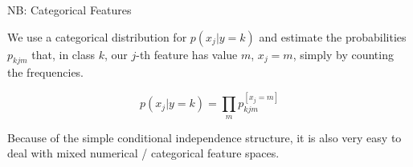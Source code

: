\documentclass[11pt,compress,t,notes=noshow, xcolor=table]{beamer}
\begin{document}
\begin{frame}{NB: Categorical Features}

We use a categorical distribution for $p(x_j | y = k)$ and estimate the probabilities $p_{kjm}$ that, in class $k$, our $j$-th feature has value $m$, $x_j = m$, simply by counting the frequencies.

$$
p(x_j | y = k) = \prod_m p_{kjm}^{[x_j = m]}
$$

Because of the simple conditional independence structure, it is also very easy to deal with mixed numerical / categorical feature spaces.

\begin{flushright}
\end{flushright}

\end{frame}
\end{document}
